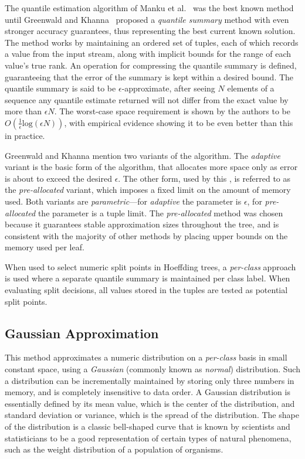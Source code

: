 The quantile estimation algorithm of Manku et al.~\cite{mrl_dbquant} was the best known method until Greenwald and Khanna~\cite{gkquantile} proposed a {\em quantile summary} method with even stronger accuracy guarantees, thus representing the best current known solution. The method works by maintaining an ordered set of tuples, each of which records a value from the input stream, along with implicit bounds for the range of each value's true rank.
An operation for compressing the quantile summary is defined, guaranteeing that the error of the summary is kept within a desired bound. The quantile summary is said to be $\epsilon$-approximate, after seeing $N$ elements of a sequence any quantile estimate returned will not differ from the exact value by more than $\epsilon N$. The worst-case space requirement is shown by the authors to be $O(\frac{1}{\epsilon} \mathrm{log} (\epsilon N))$, with empirical evidence showing it to be even better than this in practice.

Greenwald and Khanna mention two variants of the algorithm. The {\em adaptive} variant is the basic form of the algorithm, that allocates more space only as error is about to exceed the desired $\epsilon$. The other form, used by this \thesisc, is referred to as the {\em pre-allocated} variant, which imposes a fixed limit on the amount of memory used. Both variants are {\em parametric}---for {\em adaptive} the parameter is $\epsilon$, for {\em pre-allocated} the parameter is a tuple limit. The {\em pre-allocated} method was chosen because it guarantees stable approximation sizes throughout the tree, and is consistent with the majority of other methods by placing upper bounds on the memory used per leaf.

When used to select numeric split points in Hoeffding trees, a {\em per-class} approach is used where a separate quantile summary is maintained per class label. When evaluating split decisions, all values stored in the tuples are tested as potential split points. %

\subsection{Gaussian Approximation}
\label{sec:gaussapprox}

This method approximates a numeric distribution on a {\em per-class} basis in
small constant space, using a {\em Gaussian} (commonly known as {\em normal}) distribution. Such a distribution can be incrementally maintained by storing only three numbers in memory, and is completely insensitive to data order. A Gaussian distribution is essentially defined by its mean value, which is the center of the distribution, and standard deviation or variance, which is the spread of the distribution. The shape of the distribution is a classic bell-shaped curve that is known by scientists and statisticians to be a good representation of certain types of natural phenomena, such as the weight distribution of a population of organisms.

